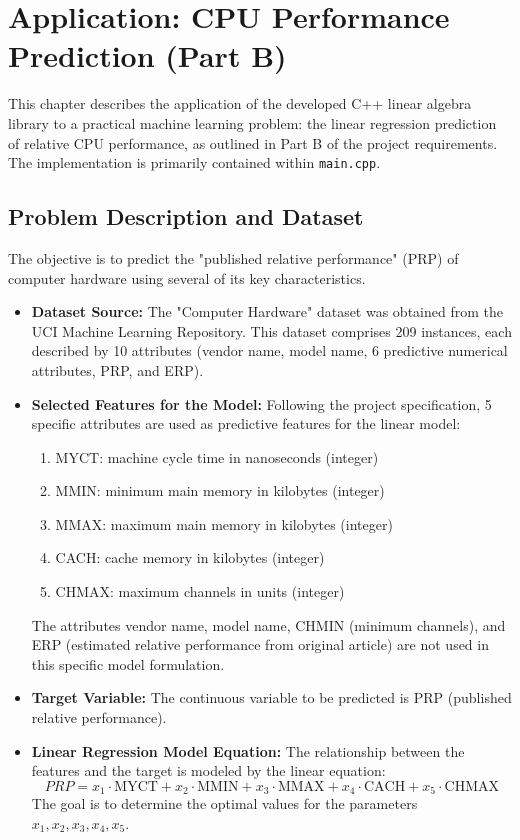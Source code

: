 \chapter{Application: CPU Performance Prediction (Part B)}
\label{chap:application}

This chapter describes the application of the developed C++ linear algebra library to a practical machine learning problem: the linear regression prediction of relative CPU performance, as outlined in Part B of the project requirements. The implementation is primarily contained within \texttt{main.cpp}.

\section{Problem Description and Dataset}
\label{sec:dataset_partb} %
The objective is to predict the "published relative performance" (PRP) of computer hardware using several of its key characteristics.
\begin{itemize}
    \item \textbf{Dataset Source:} The "Computer Hardware" dataset was obtained from the UCI Machine Learning Repository. This dataset comprises 209 instances, each described by 10 attributes (vendor name, model name, 6 predictive numerical attributes, PRP, and ERP).
    \item \textbf{Selected Features for the Model:} Following the project specification, 5 specific attributes are used as predictive features for the linear model:
    \begin{enumerate}
        \item MYCT: machine cycle time in nanoseconds (integer)
        \item MMIN: minimum main memory in kilobytes (integer)
        \item MMAX: maximum main memory in kilobytes (integer)
        \item CACH: cache memory in kilobytes (integer)
        \item CHMAX: maximum channels in units (integer)
    \end{enumerate}
    The attributes vendor name, model name, CHMIN (minimum channels), and ERP (estimated relative performance from original article) are not used in this specific model formulation.
    \item \textbf{Target Variable:} The continuous variable to be predicted is PRP (published relative performance).
    \item \textbf{Linear Regression Model Equation:} The relationship between the features and the target is modeled by the linear equation:
    $$ PRP = x_1 \cdot \text{MYCT} + x_2 \cdot \text{MMIN} + x_3 \cdot \text{MMAX} + x_4 \cdot \text{CACH} + x_5 \cdot \text{CHMAX} $$
    The goal is to determine the optimal values for the parameters $x_1, x_2, x_3, x_4, x_5$.
\end{itemize}

